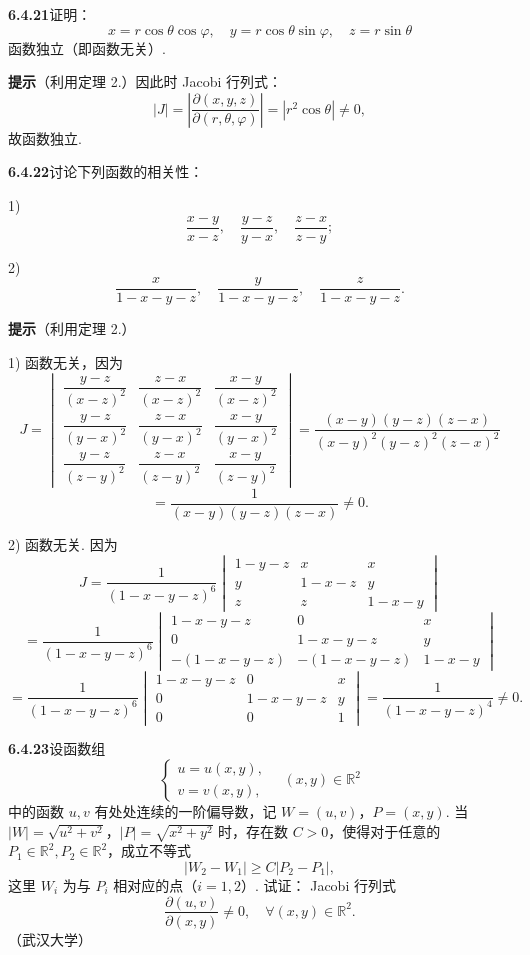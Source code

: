 \documentclass[UTF8, 12pt, fontset=fandol, oneside]{ctexart}
\begin{document}
\noindent\textbf{6.4.21}\quad 证明：
\[
  x=r\cos\theta\cos\varphi,\quad
  y=r\cos\theta\sin\varphi,\quad
  z=r\sin\theta
\]
函数独立（即函数无关）.

\noindent\textbf{提示}\quad （利用定理 2.）因此时 Jacobi 行列式：
\[
  |J|=\left|\frac{\partial(x,y,z)}{\partial(r,\theta,\varphi)}\right|
  =|r^2\cos\theta|\ne0,
\]
故函数独立.

\noindent\textbf{6.4.22}\quad 讨论下列函数的相关性：

1)
\[
  \frac{x-y}{x-z},\quad \frac{y-z}{y-x},\quad \frac{z-x}{z-y};
\]

2)
\[
  \frac{x}{1-x-y-z},\quad
  \frac{y}{1-x-y-z},\quad
  \frac{z}{1-x-y-z}.
\]

\noindent\textbf{提示}\quad （利用定理 2.）

1) 函数无关，因为
\[
J=
\begin{vmatrix}
  \dfrac{y-z}{(x-z)^2}&\dfrac{z-x}{(x-z)^2}&\dfrac{x-y}{(x-z)^2}\\[6pt]
  \dfrac{y-z}{(y-x)^2}&\dfrac{z-x}{(y-x)^2}&\dfrac{x-y}{(y-x)^2}\\[6pt]
  \dfrac{y-z}{(z-y)^2}&\dfrac{z-x}{(z-y)^2}&\dfrac{x-y}{(z-y)^2}
\end{vmatrix}
=
\frac{(x-y)(y-z)(z-x)}
{(x-y)^2(y-z)^2(z-x)^2}
\]
\[
  =
  \frac1{(x-y)(y-z)(z-x)}\ne0.
\]

2) 函数无关. 因为
\[
  J=\frac1{(1-x-y-z)^6}
  \begin{vmatrix}
    1-y-z&x&x\\
    y&1-x-z&y\\
    z&z&1-x-y
  \end{vmatrix}
\]
\[
  =
  \frac1{(1-x-y-z)^6}
  \begin{vmatrix}
    1-x-y-z&0&x\\
    0&1-x-y-z&y\\
    -(1-x-y-z)&-(1-x-y-z)&1-x-y
  \end{vmatrix}
\]
\[
  =
  \frac1{(1-x-y-z)^6}
  \begin{vmatrix}
    1-x-y-z&0&x\\
    0&1-x-y-z&y\\
    0&0&1
  \end{vmatrix}
  =
  \frac1{(1-x-y-z)^4}\ne0.
\]

\noindent\textbf{6.4.23}\quad 设函数组
\[
\begin{cases}
  u=u(x,y),\\
  v=v(x,y),
\end{cases}
\quad (x,y)\in\mathbb R^2
\]
中的函数 $u,v$ 有处处连续的一阶偏导数，记 $W=(u,v)$，$P=(x,y)$. 当
$|W|=\sqrt{u^2+v^2}$，$|P|=\sqrt{x^2+y^2}$ 时，存在数 $C>0$，使得对于任意的
$P_1\in\mathbb R^2,P_2\in\mathbb R^2$，成立不等式
\[
  |W_2-W_1|\ge C|P_2-P_1|,
\]
这里 $W_i$ 为与 $P_i$ 相对应的点（$i=1,2$）. 试证：
Jacobi 行列式
\[
  \frac{\partial(u,v)}{\partial(x,y)}\ne0,\quad \forall(x,y)\in\mathbb R^2.
\]
（武汉大学）
\end{document}
